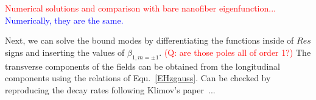 \documentclass[]{report}
\begin{document}
\textcolor{red}{Numerical solutions and comparison with bare nanofiber eigenfunction... }\textcolor{blue}{Numerically, they are the same.}

Next, we can solve the bound modes by differentiating the functions inside of $ Res $ signs and inserting the values of $ \beta_{1,m=\pm 1} $. \textcolor{red}{(Q: are those poles all of order 1?)} The transverse components of the fields can be obtained from the longitudinal components using the relations of Equ.~\ref{EHzgauss}. 
Can be checked by reproducing the decay rates following Klimov's paper~\cite{Klimov2004}... 
\end{document}
